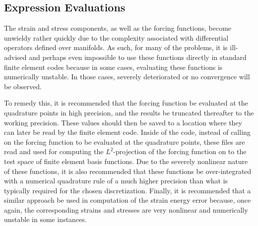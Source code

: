 \documentclass[10pt]{article}
\numberwithin{equation}{section}
\begin{document}
\subsection*{Expression Evaluations}

The strain and stress components, as well as the forcing functions, become unwieldy rather quickly due to the complexity associated with differential operators defined over manifolds. As such, for many of the problems, it is ill-advised and perhaps even impossible to use these functions directly in standard finite element codes because in some cases, evaluating these functions is numerically unstable. In those cases, severely deteriorated or no convergence will be observed.

To remedy this, it is recommended that the forcing function be evaluated at the quadrature points in high precision, and the results be truncated thereafter to the working precision. These values should then be saved to a location where they can later be read by the finite element code. Inside of the code, instead of calling on the forcing function to be evaluated at the quadrature points, these files are read and used for computing the $L^2$-projection of the forcing function on to the test space of finite element basis functions. Due to the severely nonlinear nature of these functions, it is also recommended that these functions be over-integrated with a numerical quadrature rule of a much higher precision than what is typically required for the chosen discretization. Finally, it is recommended that a similar approach be used in computation of the strain energy error because, once again, the corresponding strains and stresses are very nonlinear and numerically unstable in some instances.
\end{document}

